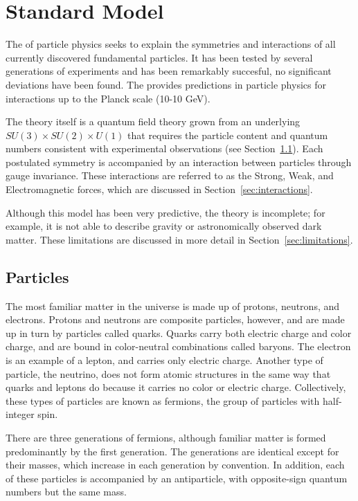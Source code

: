\chapter{Standard Model}

\label{ch:standardmodel}

The \SM of particle physics seeks to explain the symmetries and interactions of all currently discovered fundamental particles. 
It has been tested by several generations of experiments and has been remarkably succesful, no significant deviations have been found. 
The \SM provides predictions in particle physics for interactions up to the Planck scale (10-10 GeV). 

The theory itself is a quantum field theory grown from an underlying $SU(3) \times SU(2) \times U(1)$ that requires the particle content and quantum numbers consistent with experimental observations (see Section~\ref{sec:particles}). 
Each postulated symmetry is accompanied by an interaction between particles through gauge invariance. 
These interactions are referred to as the Strong, Weak, and Electromagnetic forces, which are discussed in Section~\ref{sec:interactions}. 

Although this model has been very predictive, the theory is incomplete; for example, it is not able to describe gravity or astronomically observed dark matter. 
These limitations are discussed in more detail in Section~\ref{sec:limitations}. 

\section{Particles}
\label{sec:particles}

The most familiar matter in the universe is made up of protons, neutrons, and electrons. 
Protons and neutrons are composite particles, however, and are made up in turn by particles called quarks. 
Quarks carry both electric charge and color charge, and are bound in color-neutral combinations called baryons. 
The electron is an example of a lepton, and carries only electric charge. 
Another type of particle, the neutrino, does not form atomic structures in the same way that quarks and leptons do because it carries no color or electric charge. 
Collectively, these types of particles are known as fermions, the group of particles with half-integer spin. 

There are three generations of fermions, although familiar matter is formed predominantly by the first generation. 
The generations are identical except for their masses, which increase in each generation by convention. 
In addition, each of these particles is accompanied by an antiparticle, with opposite-sign quantum numbers but the same mass.

